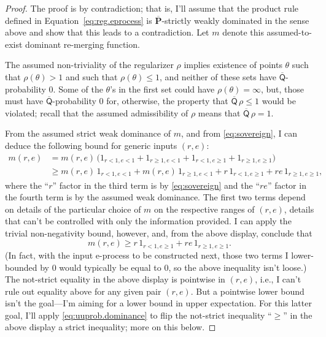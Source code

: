 \documentclass[a4paper, 12pt]{article}
\theoremstyle{plain}
\theoremstyle{definition}
\theoremstyle{remark}
\newcommand{\uprior}{\overline{\mathsf{Q}}}
\newcommand{\uuprob}{\mathbf{\overline{P}}}
\begin{document}
\begin{proof}
The proof is by contradiction; that is, I'll assume that the product rule defined in Equation~\eqref{eq:reg.eprocess} is $\uuprob$-strictly weakly dominated in the sense above and show that this leads to a contradiction.  Let $m$ denote this assumed-to-exist dominant re-merging function. 

The assumed non-triviality of the regularizer $\rho$ implies existence of points $\theta$ such that $\rho(\theta) > 1$ and such that $\rho(\theta) \leq 1$, and neither of these sets have $\uprior$-probability 0.  Some of the $\theta$'s in the first set could have $\rho(\theta) = \infty$, but, those must have  $\uprior$-probability 0 for, otherwise, the property that $\uprior\,\rho \leq 1$ would be violated; recall that the assumed admissibility of $\rho$ means that $\uprior\,\rho=1$.  

From the assumed strict weak dominance of $m$, and from \eqref{eq:sovereign}, I can deduce the following bound for generic inputs $(r,e)$:
\begin{align*}
m(r,e) & = m(r,e) \, \bigl( 1_{r < 1, e < 1} + 1_{r \geq 1, e < 1} + 1_{r < 1, e \geq 1} + 1_{r \geq 1, e \geq 1} \bigr) \\
& \geq  m(r,e) \, 1_{r < 1, e < 1} + m(r,e) \, 1_{r \geq 1, e < 1} + r \, 1_{r < 1, e \geq 1} + re \, 1_{r \geq 1, e \geq 1},
\end{align*}
where the ``$r$'' factor in the third term is by \eqref{eq:sovereign} and the ``$re$'' factor in the fourth term is by the assumed weak dominance.  The first two terms depend on details of the particular choice of $m$ on the respective ranges of $(r,e)$, details that can't be controlled with only the information provided.  I can apply the trivial non-negativity bound, however, and, from the above display, conclude that 
\[ m(r,e) \geq r \, 1_{r < 1, e \geq 1} + re \, 1_{r \geq 1, e \geq 1}. \]
(In fact, with the input e-process to be constructed next, those two terms I lower-bounded by 0 would typically be equal to 0, so the above inequality isn't loose.)  The not-strict equality in the above display is pointwise in $(r,e)$, i.e., I can't rule out equality above for any given pair $(r,e)$.  But a pointwise lower bound isn't the goal---I'm aiming for a lower bound in upper expectation.  For this latter goal, I'll apply \eqref{eq:uuprob.dominance} to flip the not-strict inequality ``$\geq$'' in the above display a strict inequality; more on this below.  


\end{proof}
\end{document}

